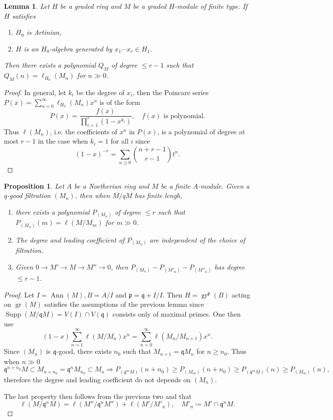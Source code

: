 \documentclass[leqno]{amsart}
\DeclareMathOperator{\gr}{gr}
\DeclareMathOperator{\Supp}{Supp}
\DeclareMathOperator{\Ann}{Ann}
\newcommand{\1}{\mathbf{1}}
\newcommand{\fp}{\mathfrak p}
\newcommand{\fq}{\mathfrak q}
\newtheorem{lem}[thm]{Lemma}
\newtheorem{prop}[thm]{Proposition}
\theoremstyle{definition}
\theoremstyle{remark}
\begin{document}
\begin{lem}
	Let $H$ be a graded ring and 
	$M$ be a graded $H$-module of finite type.
	If $H$ satisfies 
	\begin{enumerate}[label=(\alph*)]
		\item $H_0$ is Artinian,
		\item $H$ is an $H_0$-algebra generated by 
			$x_1\cdots x_r\in H_1$.
	\end{enumerate}
	Then there exists a polynomial $Q_M$ of degree
	$\leq r-1$ such that $Q_M(n)=\ell_{H_0}(M_n)$ for  $n\gg0$.
\end{lem}
\begin{proof}
	In general, let $k_i$ be the degree of $x_i$,
	then the Poincare series  
	$P(x)=\sum_{n=0}^\infty \ell_{H_0}(M_n)x^n$ is of the form
	\[
		P(x)=\frac{f(x)}{\prod_{i=1}^{r}(1-x^{k_i})},\quad
		f(x) \text{ is polynomial.}
	\]	
	Thus $\ell(M_n)$, i.e. the coefficients of $x^n$
	in  $P(x)$, is a polynomial of degree at most $r-1$
	in the case when $k_i=1$ for all  $i$ since
	\[
		(1-x)^{-r}=\sum_{n\geq 0}\binom{n+r-1}{r-1}t^n.
	\]
\end{proof}

\begin{prop}\label{prop:Hilbert-Samuel}
	Let $A$ be a Noetherian ring 
	and $M$ be a finite $A$-module.
	Given a $q$-good filtration $(M_n)$,
	then when $M/qM$ has finite lengh,
	\begin{enumerate}[label=(\alph*)]
	\item 
	there exists a polynomial  $P_{(M_n)}$
	of degree $\leq r$
	such that $P_{(M_n)}(m)=\ell(M/M_m)$ for $m\gg0$.
	\item 
	The degree and leading coefficient of $P_{(M_n)}$
	are independent of the choice of filtration.
	\item 
	Given $0\to M'\to M\to M''\to 0$, then
	 $P_{(M_n)}-P_{(M'_n)}-P_{(M''_n)}$ has degree $\leq r-1$.
	\end{enumerate}
\end{prop}
\begin{proof}
	Let $I=\Ann(M), B=A/I$ and $\fp=\fq+I/I$.
	Then $H=\gr^{\fp}(B)$ acting on $\gr(M)$ satisfies
	the assumptions of the previous lemma
	since $\Supp(M/\fq M)=V(I) \cap V(\fq)$
	consists only of maximal primes. 
	One then use 
	\[
		(1-x)\sum_{n=1}^\infty \ell(M/M_n)x^n
		=\sum_{n=0}^\infty \ell(M_n/M_{n+1})x^n.
	\]
	Since $(M_n)$ is $\fq$-good, there exists $n_0$ such that 
	$M_{n+1}=\fq M_n$ for $n\geq n_{0}$. Thus when $n\gg 0$
	 \[
		\fq^{n+n_0}M\subset M_{n+n_0}=\fq^nM_{n_0}\subset M_n
		\Longrightarrow
		P_{(\fq^mM)}(n+n_0)\geq P_{(M_m)}(n+n_0)\geq 
		P_{(\fq^mM)}(n)\geq P_{(M_m)}(n),
	\]
	therefore the degree and leading coefficient
	do not depends on $(M_n)$.

	The last property then follows from the previous two 
	and that
	\[
		 \ell(M/\fq^nM)=\ell(M''/\fq^nM'')+\ell(M'/M'_n),\quad
		 M'_n\coloneqq M'\cap \fq^nM.
	\]
\end{proof}
\end{document}
